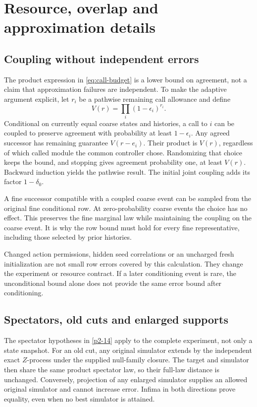 

\section{Resource, overlap and approximation details}\label{app:resources}
\subsection{Coupling without independent errors}
The product expression in \cref{eq:call-budget} is a lower bound on agreement, not a claim that approximation failures are independent. To make the adaptive argument explicit, let \(r_i\) be a pathwise remaining call allowance and define
\[
 V(r)=\prod_i(1-\epsilon_i)^{r_i}.
\]
Conditional on currently equal coarse states and histories, a call to \(i\) can be coupled to preserve agreement with probability at least \(1-\epsilon_i\). Any agreed successor has remaining guarantee \(V(r-e_i)\). Their product is \(V(r)\), regardless of which called module the common controller chose. Randomizing that choice keeps the bound, and stopping gives agreement probability one, at least \(V(r)\). Backward induction yields the pathwise result. The initial joint coupling adds its factor \(1-\delta_0\).

A fine successor compatible with a coupled coarse event can be sampled from the original fine conditional row. At zero-probability coarse events the choice has no effect. This preserves the fine marginal law while maintaining the coupling on the coarse event. It is why the row bound must hold for every fine representative, including those selected by prior histories.

Changed action permissions, hidden seed correlations or an uncharged fresh initialization are not small row errors covered by this calculation. They change the experiment or resource contract. If a later conditioning event is rare, the unconditional bound alone does not provide the same error bound after conditioning.

\subsection{Spectators, old cuts and enlarged supports}
The spectator hypotheses in \cref{p2-14} apply to the complete experiment, not only a state snapshot. For an old cut, any original simulator extends by the independent exact \(Z\)-process under the supplied null-family closure. The target and simulator then share the same product spectator law, so their full-law distance is unchanged. Conversely, projection of any enlarged simulator supplies an allowed original simulator and cannot increase error. Infima in both directions prove equality, even when no best simulator is attained.

